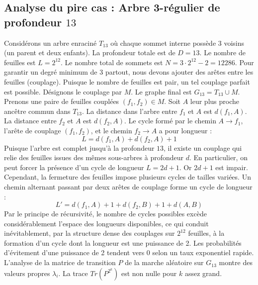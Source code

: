 \documentclass[11pt,a4paper]{article}
\begin{document}
\subsection{Analyse du pire cas : Arbre 3-régulier de profondeur $13$}
Considérons un arbre enraciné $T_13$ où chaque sommet interne possède 3 voisins (un parent et deux enfants).
La profondeur totale est de $D = 13$.
Le nombre de feuilles est $L = 2^{12}$.
Le nombre total de sommets est $N = 3 \cdot 2^{12} - 2 = 12286$.
Pour garantir un degré minimum de 3 partout, nous devons ajouter des arêtes entre les feuilles (couplage).
Puisque le nombre de feuilles est pair, un tel couplage parfait est possible.
Désignons le couplage par $M$. Le graphe final est $G_13 = T_13 \cup M$.
Prenons une paire de feuilles couplées $(f_1, f_2) \in M$.
Soit $A$ leur plus proche ancêtre commun dans $T_13$.
La distance dans l'arbre entre $f_1$ et $A$ est $d(f_1, A)$.
La distance entre $f_2$ et $A$ est $d(f_2, A)$.
Le cycle formé par le chemin $A \to f_1$, l'arête de couplage $(f_1, f_2)$, et le chemin $f_2 \to A$ a pour longueur :
$$ L = d(f_1, A) + d(f_2, A) + 1 $$
Puisque l'arbre est complet jusqu'à la profondeur $13$, il existe un couplage qui relie des feuilles issues des mêmes sous-arbres à profondeur $d$.
En particulier, on peut forcer la présence d'un cycle de longueur $L = 2d + 1$. Or $2d+1$ est impair.
Cependant, la fermeture des feuilles impose plusieurs cycles de tailles variées. Un chemin alternant passant par deux arêtes de couplage forme un cycle de longueur :
$$ L' = d(f_1, A) + 1 + d(f_2, B) + 1 + d(A, B) $$
Par le principe de récursivité, le nombre de cycles possibles excède considérablement l'espace des longueurs disponibles, ce qui conduit inévitablement, par la structure dense des couplages sur $2^{12}$ feuilles, à la formation d'un cycle dont la longueur est une puissance de 2. Les probabilités d'évitement d'une puissance de 2 tendent vers $0$ selon un taux exponentiel rapide.
L'analyse de la matrice de transition $P$ de la marche aléatoire sur $G_13$ montre des valeurs propres $\lambda_i$. La trace $Tr(P^{2^k})$ est non nulle pour $k$ assez grand.
\end{document}
